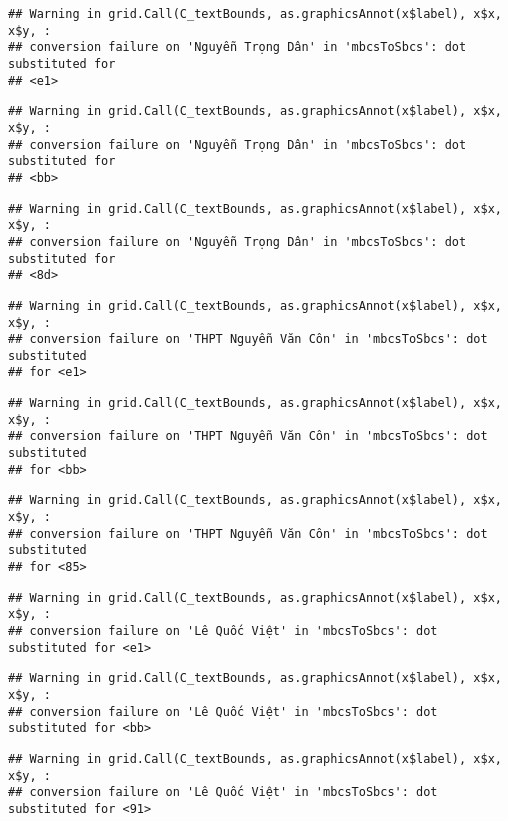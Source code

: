\documentclass[
]{article}
\begin{document}
\begin{verbatim}
## Warning in grid.Call(C_textBounds, as.graphicsAnnot(x$label), x$x, x$y, :
## conversion failure on 'Nguyễn Trọng Dân' in 'mbcsToSbcs': dot substituted for
## <e1>
\end{verbatim}

\begin{verbatim}
## Warning in grid.Call(C_textBounds, as.graphicsAnnot(x$label), x$x, x$y, :
## conversion failure on 'Nguyễn Trọng Dân' in 'mbcsToSbcs': dot substituted for
## <bb>
\end{verbatim}

\begin{verbatim}
## Warning in grid.Call(C_textBounds, as.graphicsAnnot(x$label), x$x, x$y, :
## conversion failure on 'Nguyễn Trọng Dân' in 'mbcsToSbcs': dot substituted for
## <8d>
\end{verbatim}

\begin{verbatim}
## Warning in grid.Call(C_textBounds, as.graphicsAnnot(x$label), x$x, x$y, :
## conversion failure on 'THPT Nguyễn Văn Côn' in 'mbcsToSbcs': dot substituted
## for <e1>
\end{verbatim}

\begin{verbatim}
## Warning in grid.Call(C_textBounds, as.graphicsAnnot(x$label), x$x, x$y, :
## conversion failure on 'THPT Nguyễn Văn Côn' in 'mbcsToSbcs': dot substituted
## for <bb>
\end{verbatim}

\begin{verbatim}
## Warning in grid.Call(C_textBounds, as.graphicsAnnot(x$label), x$x, x$y, :
## conversion failure on 'THPT Nguyễn Văn Côn' in 'mbcsToSbcs': dot substituted
## for <85>
\end{verbatim}

\begin{verbatim}
## Warning in grid.Call(C_textBounds, as.graphicsAnnot(x$label), x$x, x$y, :
## conversion failure on 'Lê Quốc Việt' in 'mbcsToSbcs': dot substituted for <e1>
\end{verbatim}

\begin{verbatim}
## Warning in grid.Call(C_textBounds, as.graphicsAnnot(x$label), x$x, x$y, :
## conversion failure on 'Lê Quốc Việt' in 'mbcsToSbcs': dot substituted for <bb>
\end{verbatim}

\begin{verbatim}
## Warning in grid.Call(C_textBounds, as.graphicsAnnot(x$label), x$x, x$y, :
## conversion failure on 'Lê Quốc Việt' in 'mbcsToSbcs': dot substituted for <91>
\end{verbatim}
\end{document}
